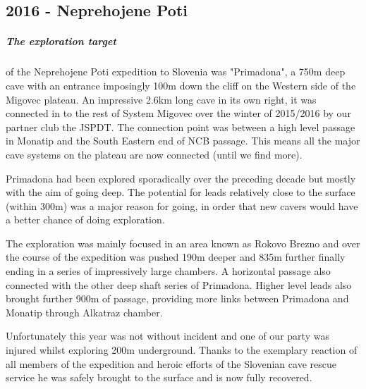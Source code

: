 \newpage

\BgThispage

\begin{tcolorbox}
\chapter{2016 - Neprehojene Poti}
	\paragraph{The exploration target} of the Neprehojene Poti expedition to Slovenia was "Primadona", a 750m deep cave with an entrance imposingly 100m down the cliff on the Western side of the Migovec plateau. An impressive 2.6km long cave in its own right, it was connected in to the rest of System Migovec over the winter of 2015/2016 by our partner club the JSPDT. The connection point was between a high level passage in Monatip and the South Eastern end of NCB passage. This means all the major cave systems on the plateau are now connected (until we find more).

	Primadona had been explored sporadically over the preceding decade but mostly with the aim of going deep. The potential for leads relatively close to the surface (within 300m) was a major reason for going, in order that new cavers would have a better chance of doing exploration.

	The exploration was mainly focused in an area known as Rokovo Brezno and over the course of the expedition was pushed 190m deeper and 835m further finally ending in a series of impressively large chambers.  A horizontal passage also connected with the other deep shaft series of Primadona. Higher level leads also brought further 900m of passage, providing more links between Primadona and Monatip through Alkatraz chamber.

	Unfortunately this year was not without incident and one of our party was injured whilst exploring 200m underground. Thanks to the exemplary reaction of all members of the expedition and heroic efforts of the Slovenian cave rescue service he was safely brought to the surface and is now fully recovered.
	\\
	\\
	\\
\end{tcolorbox}